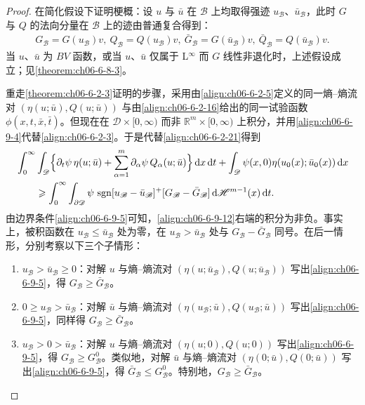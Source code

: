 \documentclass[../../main.tex]{subfiles}
\begin{document}
\begin{proof}
在简化假设下证明梗概：设 $u$ 与 $\bar{u}$ 在 $\mathscr{B}$ 上均取得强迹 $u_{\mathscr{B}}$、$\bar{u}_{\mathscr{B}}$，此时 $G$ 与 $Q$ 的法向分量在 $\mathscr{B}$ 上的迹由普通复合得到：
\begin{align}
G_{\mathscr{B}}=G(u_{\mathscr{B}})v,\ Q_{\mathscr{B}}=Q(u_{\mathscr{B}})v,\ \bar{G}_{\mathscr{B}}=G(\bar{u}_{\mathscr{B}})v,\ \bar{Q}_{\mathscr{B}}=Q(\bar{u}_{\mathscr{B}})v.
\label{align:ch06-6-9-11}
\end{align}
当 $u$、$\bar{u}$ 为 $BV$ 函数，或当 $u$、$\bar{u}$ 仅属于 L$^{\infty}$ 而 $G$ 线性非退化时，上述假设成立；见\cref{theorem:ch06-6-8-3}。

重走\cref{theorem:ch06-6-2-3}证明的步骤，采用由\eqref{align:ch06-6-2-5}定义的同一熵--熵流对 $(\eta(u;\bar{u}),Q(u;\bar{u}))$ 与由\eqref{align:ch06-6-2-16}给出的同一试验函数 $\phi(x,t,\bar{x},\bar{t})$。但现在在 $\mathscr{D}\times[0,\infty)$ 而非 $\mathbb{R}^{m}\times[0,\infty)$ 上积分，并用\eqref{align:ch06-6-9-4}代替\eqref{align:ch06-6-2-3}。于是代替\eqref{align:ch06-6-2-21}得到
\begin{align}
&\int_{0}^{\infty}\int_{\mathscr{D}}\Bigl{\{}\partial_{t}\psi\,\eta(u;\bar{u})+\sum_{\alpha=1}^{m}\partial_{\alpha}\psi\,Q_{\alpha}(u;\bar{u})\Bigr{\}}\,\mathrm{d}x\,\mathrm{d}t+\int_{\mathscr{D}}\psi(x,0)\eta(u_{0}(x);\bar{u}_{0}(x))\,\mathrm{d}x\notag\\
&\qquad\geqslant\int_{0}^{\infty}\int_{\partial\mathscr{D}}\psi\,\operatorname{sgn}[u_{\mathscr{B}}-\bar{u}_{\mathscr{B}}]^{+}[G_{\mathscr{B}}-\bar{G}_{\mathscr{B}}]\,\mathrm{d}\mathscr{H}^{m-1}(x)\,\mathrm{d}t.
\label{align:ch06-6-9-12}
\end{align}
由边界条件\eqref{align:ch06-6-9-5}可知，\eqref{align:ch06-6-9-12}右端的积分为非负。事实上，被积函数在 $u_{\mathscr{B}}\leqslant\bar{u}_{\mathscr{B}}$ 处为零，在 $u_{\mathscr{B}}>\bar{u}_{\mathscr{B}}$ 处与 $G_{\mathscr{B}}-\bar{G}_{\mathscr{B}}$ 同号。在后一情形，分别考察以下三个子情形：
\begin{enumerate}
\item[(a)] $u_{\mathscr{B}}>\bar{u}_{\mathscr{B}}\geqslant 0$：对解 $u$ 与熵--熵流对 $(\eta(u;\bar{u}_{\mathscr{B}}),Q(u;\bar{u}_{\mathscr{B}}))$ 写出\eqref{align:ch06-6-9-5}，得 $G_{\mathscr{B}}\geqslant\bar{G}_{\mathscr{B}}$。
\item[(b)] $0\geqslant u_{\mathscr{B}}>\bar{u}_{\mathscr{B}}$：对解 $\bar{u}$ 与熵--熵流对 $(\eta(u_{\mathscr{B}};\bar{u}),Q(u_{\mathscr{B}};\bar{u}))$ 写出\eqref{align:ch06-6-9-5}，同样得 $G_{\mathscr{B}}\geqslant\bar{G}_{\mathscr{B}}$。
\item[(c)] $u_{\mathscr{B}}>0>\bar{u}_{\mathscr{B}}$：对解 $u$ 与熵--熵流对 $(\eta(u;0),Q(u;0))$ 写出\eqref{align:ch06-6-9-5}，得 $G_{\mathscr{B}}\geqslant G_{\mathscr{B}}^{0}$。类似地，对解 $\bar{u}$ 与熵--熵流对 $(\eta(0;\bar{u}),Q(0;\bar{u}))$ 写出\eqref{align:ch06-6-9-5}，得 $\bar{G}_{\mathscr{B}}\leqslant G_{\mathscr{B}}^{0}$。特别地，$G_{\mathscr{B}}\geqslant\bar{G}_{\mathscr{B}}$。
\end{enumerate}


\end{proof}
\end{document}
